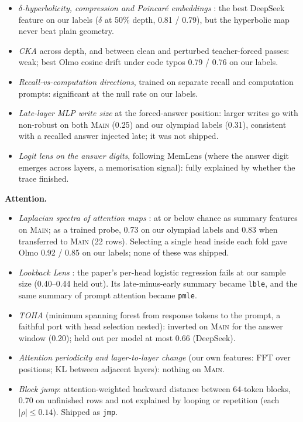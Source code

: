 \documentclass{article}
\begin{document}
\begin{itemize}
\item \emph{$\delta$-hyperbolicity, compression and Poincar\'e embeddings} \citep{raj2026hyperbolic}: the best DeepSeek feature on our labels ($\delta$ at 50\% depth, 0.81 / 0.79), but the hyperbolic map never beat plain geometry.
\item \emph{CKA} \citep{kornblith2019cka} across depth, and between clean and perturbed teacher-forced passes: weak; best Olmo cosine drift under code typos 0.79 / 0.76 on our labels.
\item \emph{Recall-vs-computation directions}, trained on separate recall and computation prompts: significant at the null rate on our labels.
\item \emph{Late-layer MLP write size} at the forced-answer position: larger writes go with non-robust on both \textsc{Main} (0.25) and our olympiad labels (0.31), consistent with a recalled answer injected late; it was not shipped.
\item \emph{Logit lens} \citep{nostalgebraist2020logitlens} \emph{on the answer digits}, following MemLens \citep{he2025memlens} (where the answer digit emerges across layers, a memorisation signal): fully explained by whether the trace finished.
\end{itemize}

\textbf{Attention.}
\begin{itemize}
\item \emph{Laplacian spectra of attention maps} \citep{binkowski2025lapeig}: at or below chance as summary features on \textsc{Main}; as a trained probe, 0.73 on our olympiad labels and 0.83 when transferred to \textsc{Main} (22 rows). Selecting a single head inside each fold gave Olmo 0.92 / 0.85 on our labels; none of these was shipped.
\item \emph{Lookback Lens} \citep{chuang2024lookback}: the paper's per-head logistic regression fails at our sample size (0.40--0.44 held out). Its late-minus-early summary became \texttt{lble}, and the same summary of prompt attention became \texttt{pmle}.
\item \emph{TOHA} \citep{bazarova2025toha} (minimum spanning forest from response tokens to the prompt, a faithful port with head selection nested): inverted on \textsc{Main} for the answer window (0.20); held out per model at most 0.66 (DeepSeek).
\item \emph{Attention periodicity and layer-to-layer change} (our own features: FFT over positions; KL between adjacent layers): nothing on \textsc{Main}.
\item \emph{Block jump}: attention-weighted backward distance between 64-token blocks, 0.70 on unfinished rows and not explained by looping or repetition (each $|\rho| \le 0.14$). Shipped as \texttt{jmp}.
\end{itemize}
\end{document}

